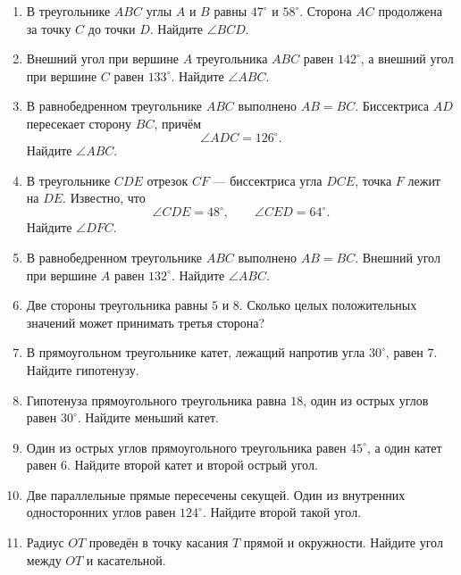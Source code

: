 \documentclass[a4paper,12pt]{article}
\newcommand{\degree}{^{\circ}}
\begin{document}
\begin{enumerate}[label=\textbf{\arabic*.}]

  \item
  В треугольнике $ABC$ углы $A$ и $B$ равны
  $47\degree$ и $58\degree$.
  Сторона $AC$ продолжена за точку $C$ до точки $D$.
  Найдите $\angle BCD$.

  \item
  Внешний угол при вершине $A$ треугольника $ABC$ равен $142\degree$,
  а внешний угол при вершине $C$ равен $133\degree$.
  Найдите $\angle ABC$.

  \item
  В равнобедренном треугольнике $ABC$ выполнено $AB=BC$.
  Биссектриса $AD$ пересекает сторону $BC$, причём
  \[
    \angle ADC=126\degree.
  \]
  Найдите $\angle ABC$.

  \item
  В треугольнике $CDE$ отрезок $CF$ — биссектриса угла $DCE$,
  точка $F$ лежит на $DE$.
  Известно, что
  \[
    \angle CDE=48\degree,
    \qquad
    \angle CED=64\degree.
  \]
  Найдите $\angle DFC$.

  \item
  В равнобедренном треугольнике $ABC$ выполнено $AB=BC$.
  Внешний угол при вершине $A$ равен $132\degree$.
  Найдите $\angle ABC$.

  \item
  Две стороны треугольника равны $5$ и $8$.
  Сколько целых положительных значений может принимать третья сторона?

  \item
  В прямоугольном треугольнике катет, лежащий напротив угла $30\degree$,
  равен $7$.
  Найдите гипотенузу.

  \item
  Гипотенуза прямоугольного треугольника равна $18$,
  один из острых углов равен $30\degree$.
  Найдите меньший катет.

  \item
  Один из острых углов прямоугольного треугольника равен $45\degree$,
  а один катет равен $6$.
  Найдите второй катет и второй острый угол.

  \item
  Две параллельные прямые пересечены секущей.
  Один из внутренних односторонних углов равен $124\degree$.
  Найдите второй такой угол.

  \item
  Радиус $OT$ проведён в точку касания $T$ прямой и окружности.
  Найдите угол между $OT$ и касательной.


\end{enumerate}
\end{document}
